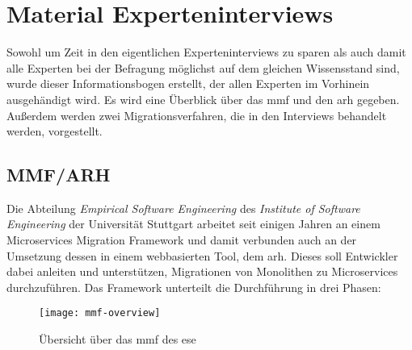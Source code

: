 \chapter{Material Experteninterviews}

Sowohl um Zeit in den eigentlichen Experteninterviews zu sparen als auch damit alle Experten bei der Befragung möglichst auf dem gleichen Wissensstand sind, wurde dieser Informationsbogen erstellt, der allen Experten im Vorhinein ausgehändigt wird.
Es wird eine Überblick über das \acrfull{mmf} und den \acrfull{arh} gegeben.
Außerdem werden zwei Migrationsverfahren, die in den Interviews behandelt werden, vorgestellt.

\section{MMF/ARH}

Die Abteilung \emph{Empirical Software Engineering} des \emph{Institute of Software Engineering} der Universität Stuttgart arbeitet seit einigen Jahren an einem Microservices Migration Framework und damit verbunden auch an der Umsetzung dessen in einem webbasierten Tool, dem \gls{arh}.
Dieses soll Entwickler dabei anleiten und unterstützen, Migrationen von Monolithen zu Microservices durchzuführen.
Das Framework unterteilt die Durchführung in drei Phasen:

\begin{figure}
	\centering
	\texttt{[image: mmf-overview]}
	\caption[\acrfull{mmf} Übersicht]{
		Übersicht über das \gls{mmf} des \gls{ese}
	}
	\label{fig:expert-material-mmf-overview}
\end{figure}

